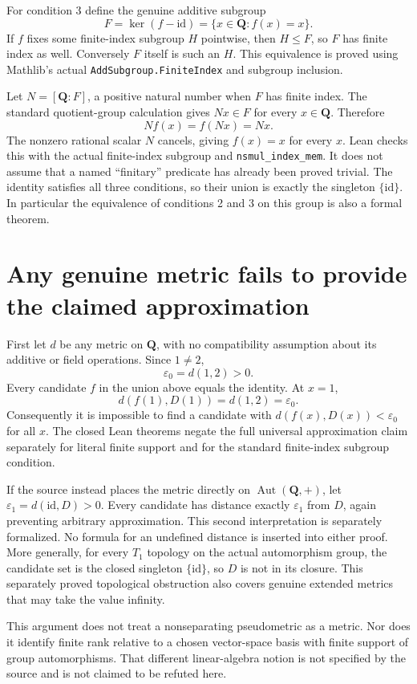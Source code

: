 \documentclass[11pt]{article}
\begin{document}
\newpage
For condition 3 define the genuine additive subgroup
\[
 F=\ker(f-\mathrm{id})=\{x\in\mathbf Q:f(x)=x\}.
\]
If $f$ fixes some finite-index subgroup $H$ pointwise, then $H\le F$,
so $F$ has finite index as well. Conversely $F$ itself is such an $H$.
This equivalence is proved using Mathlib's actual
\texttt{AddSubgroup.FiniteIndex} and subgroup inclusion.

Let $N=[\mathbf Q:F]$, a positive natural number when $F$ has finite
index. The standard quotient-group calculation gives $Nx\in F$ for
every $x\in\mathbf Q$. Therefore
\[
 Nf(x)=f(Nx)=Nx.
\]
The nonzero rational scalar $N$ cancels, giving $f(x)=x$ for every $x$.
Lean checks this with the actual finite-index subgroup and
\texttt{nsmul\_index\_mem}. It does not assume that a named
``finitary'' predicate has already been proved trivial.
The identity satisfies all three conditions, so their union is exactly
the singleton $\{\mathrm{id}\}$. In particular the equivalence of
conditions 2 and 3 on this group is also a formal theorem.

\section{Any genuine metric fails to provide the claimed approximation}
First let $d$ be any metric on $\mathbf Q$, with no compatibility
assumption about its additive or field operations. Since $1\ne2$,
\[
 \varepsilon_0=d(1,2)>0.
\]
Every candidate $f$ in the union above equals the identity. At $x=1$,
\[
 d(f(1),D(1))=d(1,2)=\varepsilon_0.
\]
Consequently it is impossible to find a candidate with
$d(f(x),D(x))<\varepsilon_0$ for all $x$. The closed Lean theorems
negate the full universal approximation claim separately for literal
finite support and for the standard finite-index subgroup condition.

If the source instead places the metric directly on
$\operatorname{Aut}(\mathbf Q,+)$, let
$\varepsilon_1=d(\mathrm{id},D)>0$. Every candidate has distance
exactly $\varepsilon_1$ from $D$, again preventing arbitrary
approximation. This second interpretation is separately formalized.
No formula for an undefined distance is inserted into either proof.
More generally, for every $T_1$ topology on the actual automorphism
group, the candidate set is the closed singleton $\{\mathrm{id}\}$,
so $D$ is not in its closure. This separately proved topological
obstruction also covers genuine extended metrics that may take the
value infinity.

This argument does not treat a nonseparating pseudometric as a metric.
Nor does it identify finite rank relative to a chosen vector-space
basis with finite support of group automorphisms. That different
linear-algebra notion is not specified by the source and is not
claimed to be refuted here.
\end{document}
